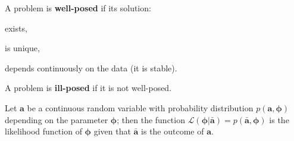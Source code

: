 
\begin{definition}
	A problem is \textbf{well-posed} if its solution:
	\begin{enumerate*}[label=(\roman*)]
		\item exists,
		\item is unique,
		\item depends continuously on the data (\eg it is stable).
	\end{enumerate*}
\end{definition}

\begin{definition} \label{def:ill_posed}
	A problem is \textbf{ill-posed} if it is not well-posed.
\end{definition}

\begin{definition} \label{def:likelihood}
	Let $\bm{a}$ be a continuous random variable with probability distribution $p(\bm{a}, \bm{\phi})$ depending on the parameter $\bm{\phi}$; then the function $\mathcal{L}(\bm{\phi}|\bm{\bar a})=p(\bm{\bar a},\bm{\phi})$ is the likelihood function of $\bm{\phi}$ given that $\bm{\bar a}$ is the outcome of $\bm{a}$.
\end{definition}


